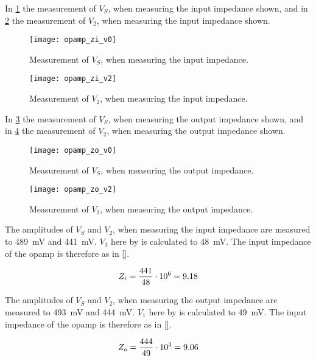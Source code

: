 In \ref{fig:opamp_zi_v0} the measurement of $V_S$, when measuring the input impedance shown, and in \ref{fig:opamp_zi_v2} the measurement of $V_2$, when measuring the input impedance shown. \\

\begin{figure}[hbt]
  \centering
  \texttt{[image: opamp\_zi\_v0]}
  \caption{Measurement of $V_S$, when measuring the input impedance.}
  \label{fig:opamp_zi_v0}
\end{figure}

\begin{figure}[hbt]
  \centering
  \texttt{[image: opamp\_zi\_v2]}
  \caption{Measurement of $V_2$, when measuring the input impedance.}
  \label{fig:opamp_zi_v2}
\end{figure}

In \ref{fig:opamp_zo_v0} the measurement of $V_S$, when measuring the output impedance shown, and in \ref{fig:opamp_zo_v2} the measurement of $V_2$, when measuring the output impedance shown. \\

\begin{figure}[hbt]
  \centering
  \texttt{[image: opamp\_zo\_v0]}
  \caption{Measurement of $V_S$, when measuring the output impedance.}
  \label{fig:opamp_zo_v0}
\end{figure}

\begin{figure}[hbt]
  \centering
  \texttt{[image: opamp\_zo\_v2]}
  \caption{Measurement of $V_2$, when measuring the output impedance.}
  \label{fig:opamp_zo_v2}
\end{figure}

The amplitudes of $V_S$ and $V_2$, when measuring the input impedance are measured to \SI{489}{\milli\volt} and \SI{441}{\milli\volt}. $V_1$ here by is calculated to \SI{48}{\milli\volt}. The input impedance of the \gls{opamp} is therefore as in \autoref{}.

\begin{equation}\label{eq:opamp_zi}
        Z_i = \frac{441}{48} \cdot 10^6 = 9.18
        \addunit{\si{\mega\ohm}}
    \end{equation} 
    
The amplitudes of $V_S$ and $V_2$, when measuring the output impedance are measured to \SI{493}{\milli\volt} and \SI{444}{\milli\volt}. $V_1$ here by is calculated to \SI{49}{\milli\volt}. The input impedance of the \gls{opamp} is therefore as in \autoref{}.

\begin{equation}\label{eq:opamp_zo}
        Z_o = \frac{444}{49} \cdot 10^3 = 9.06
        \addunit{\si{\kilo\ohm}}
    \end{equation} 